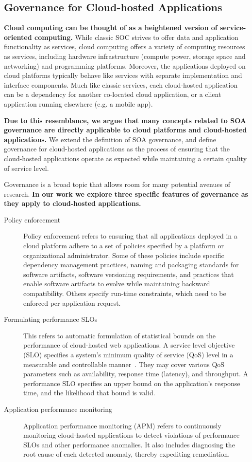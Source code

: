\subsection{Governance for Cloud-hosted Applications}
\textbf{Cloud computing can be thought of as a heightened version of service-oriented computing.} While classic
SOC strives to offer data and application functionality as services, cloud computing offers a variety
of computing resources
as services, including hardware infrastructure (compute power, storage space and networking) and programming
platforms. Moreover, the applications deployed on cloud platforms typically behave like services with
separate implementation and interface components. 
Much like classic services, each cloud-hosted application 
can be a dependency for another
co-located cloud application, or a client application running elsewhere (e.g. a mobile app). 

\textbf{Due to this resemblance, we argue that many concepts related to SOA governance are
directly applicable to cloud platforms and cloud-hosted applications.} 
We extend the definition of SOA governance, and define governance for cloud-hosted applications
as the process of ensuring that the cloud-hosted applications
operate as expected while maintaining a certain quality of service level.

Governance is a broad topic that allows room for many potential avenues of research.
\textbf{In our work we explore three specific features of governance as they apply to cloud-hosted applications.}
\begin{description}
\item [Policy enforcement]
Policy enforcement refers to ensuring that all applications deployed in a cloud platform
adhere to a set of policies specified by a platform or organizational administrator.
Some of these policies include specific
dependency management practices, naming and packaging standards for software artifacts, 
software versioning requirements, and practices that enable software artifacts to evolve 
while maintaining backward compatibility.
Others specify run-time constraints, which need to be enforced per application request.

\item [Formulating performance SLOs]
This refers to automatic formulation of statistical bounds on the 
performance of cloud-hosted web applications.
A service level objective (SLO) specifies a system's minimum quality of service (QoS) level in a measurable and
controllable manner~\cite{smj2000}. They may cover various QoS
parameters such as availability, response time (latency), and throughput. A performance SLO
specifies an upper bound on the application's response time, and the likelihood that bound is valid.

\item [Application performance monitoring]
Application performance monitoring (APM) refers to continuously monitoring cloud-hosted applications
to detect violations of performance SLOs and other performance anomalies. 
It also includes diagnosing the root cause of each detected anomaly, thereby expediting
remediation.
\end{description}

